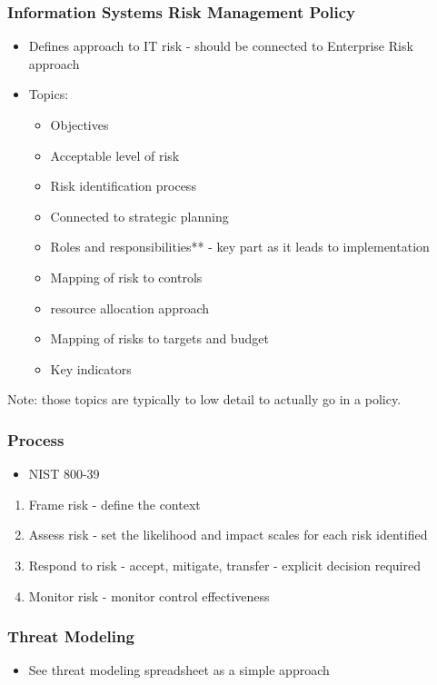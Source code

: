 \documentclass[11pt]{article}
\begin{document}
\subsubsection{Information Systems Risk Management Policy}
\label{sec:org01dbf15}
\begin{itemize}
\item Defines approach to IT risk - should be connected to Enterprise Risk approach
\item Topics:
\begin{itemize}
\item Objectives
\item Acceptable level of risk
\item Risk identification process
\item Connected to strategic planning
\item Roles and responsibilities** - key part as it leads to implementation
\item Mapping of risk to controls
\item resource allocation approach
\item Mapping of risks to targets and budget
\item Key indicators
\end{itemize}
\end{itemize}

Note: those topics are typically to low detail to actually go in a policy. 
\subsubsection{Process}
\label{sec:orga69a25f}
\begin{itemize}
\item NIST 800-39
\end{itemize}
\begin{enumerate}
\item Frame risk - define the context
\label{sec:org112c96d}
\item Assess risk - set the likelihood and impact scales for each risk identified
\label{sec:org6624622}
\item Respond to risk - accept, mitigate, transfer - explicit decision required
\label{sec:org57b4e5e}
\item Monitor risk - monitor control effectiveness
\label{sec:org9807c73}
\end{enumerate}
\subsubsection{Threat Modeling}
\label{sec:org9ef178b}
\begin{itemize}
\item See threat modeling spreadsheet as a simple approach
\end{itemize}
\end{document}
